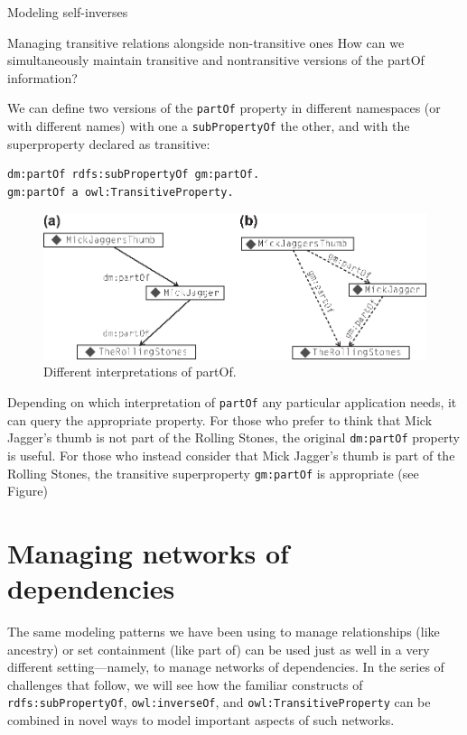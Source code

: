\begin{challenge}{Modeling self-inverses}
\begin{challenge}{Managing transitive relations alongside non-transitive ones}
\label{chal:18}
How can we simultaneously maintain transitive and nontransitive versions
of the partOf information?

\solution

We can define two versions of the \texttt{partOf} property in different
namespaces (or with different names) with one a \texttt{subPropertyOf} the other,
and with the superproperty declared as transitive:

\begin{lstlisting}
dm:partOf rdfs:subPropertyOf gm:partOf.
gm:partOf a owl:TransitiveProperty.
\end{lstlisting}


\begin{figure}
\centering
\includegraphics[width=5in]{media/ch9/f09-005.eps}
\caption{Different interpretations of partOf.}
\label{fig:ch8.5}
\end{figure}



Depending on which interpretation of \texttt{partOf} any particular application
needs, it can query the appropriate property. For those who prefer to
think that Mick Jagger's thumb is not part of the Rolling Stones, the
original \texttt{dm:partOf} property is useful. For those who instead consider
that Mick Jagger's thumb is part of the Rolling Stones, the transitive
superproperty \texttt{gm:partOf} is appropriate (see Figure\label{fig:ch8.5})
\end{challenge}

\section{Managing networks of dependencies}

The same modeling patterns we have been using to manage relationships
(like ancestry) or set containment (like part of) can be used just as
well in a very different setting---namely, to manage networks of
dependencies. In the series of challenges that follow, we will see how
the familiar constructs of \texttt{rdfs:subPropertyOf}, \texttt{owl:inverseOf}, and
\texttt{owl:TransitiveProperty} can be combined in novel ways to model important
aspects of such networks.


\end{challenge}
